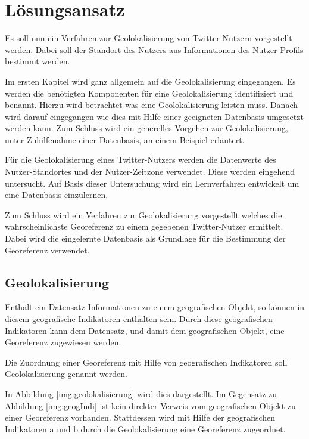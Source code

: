\chapter{Lösungsansatz} \label{chp:Loesungsansatz}
	
	Es soll nun ein Verfahren zur Geolokalisierung von Twitter-Nutzern vorgestellt werden.
	Dabei soll der Standort des Nutzers aus Informationen des Nutzer-Profils bestimmt werden.

	Im ersten Kapitel wird ganz allgemein auf die Geolokalisierung eingegangen.
	Es werden die benötigten Komponenten für eine Geolokalisierung identifiziert und benannt.
	Hierzu wird betrachtet was eine Geolokalisierung leisten muss.
	Danach wird darauf eingegangen wie dies mit Hilfe einer geeigneten Datenbasis umgesetzt werden kann.
	Zum Schluss wird ein generelles Vorgehen zur Geolokalisierung, unter Zuhilfenahme einer Datenbasis, an einem Beispiel erläutert.

	Für die Geolokalisierung eines Twitter-Nutzers werden die Datenwerte des Nutzer-Standortes und der Nutzer-Zeitzone verwendet.
	Diese werden eingehend untersucht.
	Auf Basis dieser Untersuchung wird ein Lernverfahren entwickelt um eine Datenbasis einzulernen.

	Zum Schluss wird ein Verfahren zur Geolokalisierung vorgestellt welches die wahrscheinlichste Georeferenz zu einem gegebenen Twitter-Nutzer ermittelt.
	Dabei wird die eingelernte Datenbasis als Grundlage für die Bestimmung der Georeferenz verwendet.
	
	\newpage
	
	\section{Geolokalisierung} \label{sec:ueberblick} 

		Enthält ein Datensatz Informationen zu einem geografischen Objekt, so können in diesem geografische Indikatoren enthalten sein.
		Durch diese geografischen Indikatoren kann dem Datensatz, und damit dem geografischen Objekt, eine Georeferenz zugewiesen werden. 

		Die Zuordnung einer Georeferenz mit Hilfe von geografischen Indikatoren soll Geolokalisierung genannt werden.  

		In Abbildung \ref{img:geolokalisierung} wird dies dargestellt.
		Im Gegensatz zu Abbildung \ref{img:geogIndi} ist kein direkter Verweis vom geografischen Objekt zu einer Georeferenz vorhanden. 
		Stattdessen wird mit Hilfe der geografischen Indikatoren a und b durch die Geolokalisierung eine Georeferenz zugeordnet.


